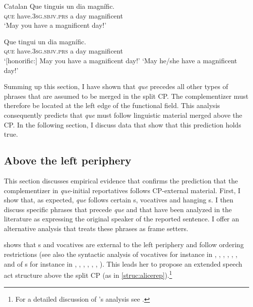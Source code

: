 \ea Catalan
\ea\label{ex:opt2}
\gll  Que tinguis un dia magnífic. \\
\textsc{que} have.\textsc{3sg.sbjv.prs} a day magnificent\\
\glt`May you have a magnificent day!'
\ex\label{ex:opt3}

\gll  Que tingui un dia magnífic. \\
\textsc{que} have.\textsc{3sg.sbjv.prs} a day magnificent\\
\glt`$[$honorific:$]$ May you have a magnificent day!'
\glt`May he/she have a magnificent day!'
\z
\z





Summing up this section, I have shown that  \emph{que} precedes all other types of phrases that are assumed to be merged in the split CP. The complementizer must therefore be located at the left edge of the functional field. This analysis  consequently predicts  that  \emph{que} must follow linguistic material merged above the CP. In the following section, I discuss data that show that this prediction  holds true.  




\subsection{Above the left periphery}\label{sec:insubalp}
This section discusses empirical evidence  that confirms the prediction that the complementizer in \emph{que}-initial reportatives follows CP-external material. First,  I show that, as expected,  \emph{que} follows certain s, vocatives and hanging s.  I then discuss specific phrases that precede \emph{que} and that have been analyzed in the literature as expressing the original speaker of the reported sentence.  I offer an alternative analysis that treats these phrases as frame setters.


\citet{Corr2016} shows that s and vocatives are external to the left periphery and follow ordering restrictions (see also the syntactic analysis of vocatives for instance in \citealt{Moro2003}, \citealt{Hill2007a,Hill2013,Hill2014}, \citealt{Moreira2013}, \citealt{Espinal2013}, \citealt{Carvalho2013}, \citealt{Stavrou2013},  and of s for instance in 
 \citealt{Munaro2009},   \citealt{Coniglio2010}, \citealt{Poletto2010}, \citealt{Bayer2011}, \citealt{Haegeman2014}, \citealt{Bayer2015}, \citealt{DelGobbo2015}). This leads her to propose an extended  speech act structure above the split CP (as in \ref{struc:alicerep}).\footnote{For a detailed discussion of \citeauthor{Corr2016}'s analysis see .} 


